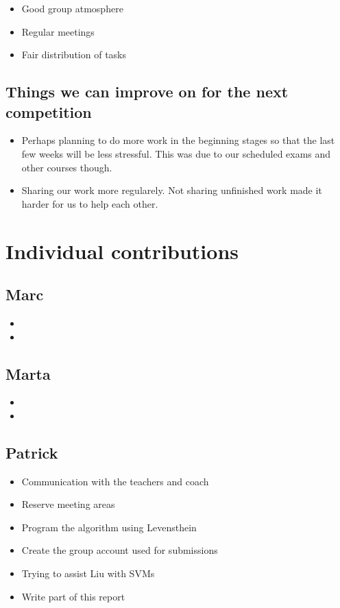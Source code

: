 \documentclass{article}
\begin{document}
\begin{itemize}
\item Good group atmosphere
\item Regular meetings
\item Fair distribution of tasks
\end{itemize}

\subsection{Things we can improve on for the next competition}

\begin{itemize}
\item Perhaps planning to do more work in the beginning stages so that the last few weeks will be less stressful. This was due to our scheduled exams and other courses though.
\item Sharing our work more regularely. Not sharing unfinished work made it harder for us to help each other.
\end{itemize}

\section{Individual contributions}

\subsection{Marc}

\begin{itemize}
\item
\item
\end{itemize}

\subsection{Marta}

\begin{itemize}
\item
\item
\end{itemize}

\subsection{Patrick}

\begin{itemize}
\item Communication with the teachers and coach
\item Reserve meeting areas
\item Program the algorithm using Levensthein
\item Create the group account used for submissions
\item Trying to assist Liu with SVMs
\item Write part of this report
\end{itemize}
\end{document}
